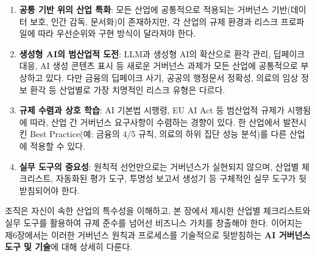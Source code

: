 \begin{enumerate}
 \item \textbf{공통 기반 위의 산업 특화}:
 모든 산업에 공통적으로 적용되는 거버넌스 기반(데이터 보호, 인간 감독,
 문서화)이 존재하지만, 각 산업의 규제 환경과 리스크 프로파일에 따라
 우선순위와 구현 방식이 달라져야 한다.

 \item \textbf{생성형 AI의 범산업적 도전}:
 LLM과 생성형 AI의 확산으로 환각 관리, 딥페이크 대응,
 AI 생성 콘텐츠 표시 등 새로운 거버넌스 과제가 모든 산업에
 공통적으로 부상하고 있다. 다만 금융의 딥페이크 사기,
 공공의 행정문서 정확성, 의료의 임상 정보 환각 등
 산업별로 가장 치명적인 리스크 유형은 다르다.

 \item \textbf{규제 수렴과 상호 학습}:
 AI 기본법 시행령, EU AI Act 등 범산업적 규제가 시행됨에 따라,
 산업 간 거버넌스 요구사항이 수렴하는 경향이 있다.
 한 산업에서 발전시킨 Best Practice(예: 금융의 4/5 규칙,
 의료의 하위 집단 성능 분석)를 다른 산업에 적용할 수 있다.

 \item \textbf{실무 도구의 중요성}:
 원칙적 선언만으로는 거버넌스가 실현되지 않으며,
 산업별 체크리스트, 자동화된 평가 도구, 투명성 보고서 생성기 등
 구체적인 실무 도구가 뒷받침되어야 한다.
\end{enumerate}

조직은 자신이 속한 산업의 특수성을 이해하고, 본 장에서 제시한 산업별 체크리스트와 실무 도구를 활용하여 규제 준수를 넘어선 비즈니스 가치를 창출해야 한다. 이어지는 제6장에서는 이러한 거버넌스 원칙과 프로세스를 기술적으로 뒷받침하는 \textbf{AI 거버넌스 도구 및 기술}에 대해 상세히 다룬다.

